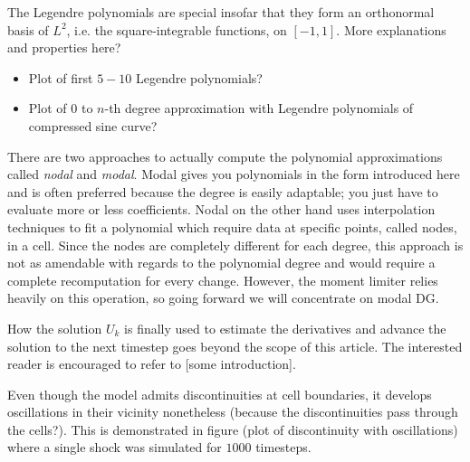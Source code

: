 The Legendre polynomials are special insofar that they form an orthonormal basis of $L^{2}$, i.e. the square-integrable functions, on $[-1, 1]$.
More explanations and properties here?
\begin{itemize}
\item Plot of first $5-10$ Legendre polynomials?
\item Plot of $0$ to $n$-th degree approximation with Legendre polynomials of compressed sine curve?
\end{itemize}

There are two approaches to actually compute the polynomial approximations called \emph{nodal} and \emph{modal}.
Modal gives you polynomials in the form introduced here and is often preferred because the degree is easily adaptable; you just have to evaluate more or less coefficients.
Nodal on the other hand uses interpolation techniques to fit a polynomial which require data at specific points, called nodes, in a cell.
Since the nodes are completely different for each degree, this approach is not as amendable with regards to the polynomial degree and would require a complete recomputation for every change.
However, the moment limiter relies heavily on this operation, so going forward we will concentrate on modal DG.

How the solution $U_{k}$ is finally used to estimate the derivatives and advance the solution to the next timestep goes beyond the scope of this article.
The interested reader is encouraged to refer to [some introduction].

Even though the model admits discontinuities at cell boundaries, it develops oscillations in their vicinity nonetheless (because the discontinuities pass through the cells?).
This is demonstrated in figure (plot of discontinuity with oscillations) where a single shock was simulated for $1000$ timesteps.

